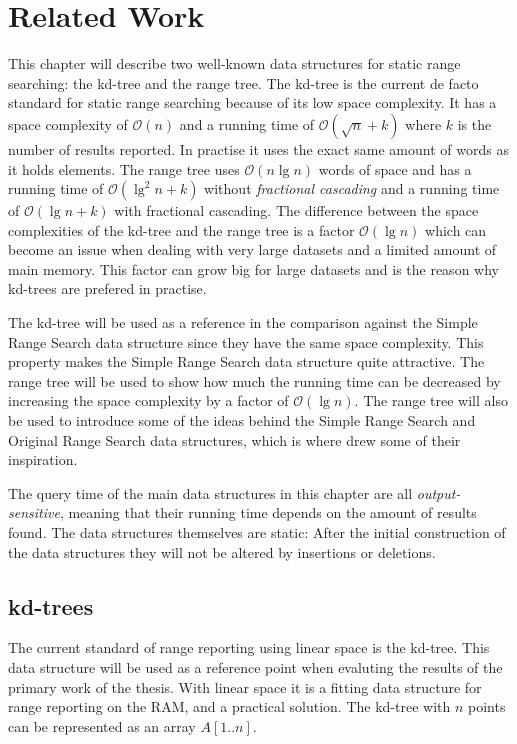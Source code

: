 \chapter{Related Work}
\label{ch:relatedwork}

This chapter will describe two well-known data structures for static range searching: the kd-tree and the range tree. The kd-tree is the current de facto standard for static range searching because of its low space complexity. It has a space complexity of $\mathcal{O}(n)$ and a running time of $\mathcal{O}(\sqrt{n} + k)$ where $k$ is the number of results reported. In practise it uses the exact same amount of words as it holds elements\cite{compgeo}. The range tree uses $\mathcal{O}(n \lg n)$ words of space and has a running time of $\mathcal{O}(\lg^2 n + k)$ without \emph{fractional cascading} and a running time of $\mathcal{O}(\lg n + k)$ with fractional cascading. The difference between the space complexities of the kd-tree and the range tree is a factor $\mathcal{O}(\lg n)$ which can become an issue when dealing with very large datasets and a limited amount of main memory. This factor can grow big for large datasets and is the reason why kd-trees are prefered in practise.

The kd-tree will be used as a reference in the comparison against the Simple Range Search data structure since they have the same space complexity. This property makes the Simple Range Search data structure quite attractive. The range tree will be used to show how much the running time can be decreased by increasing the space complexity by a factor of $\mathcal{O}(\lg n)$. The range tree will also be used to introduce some of the ideas behind the Simple Range Search and Original Range Search data structures, which is where \citet{chanetal} drew some of their inspiration.

The query time of the main data structures in this chapter are all \emph{output-sensitive}, meaning that their running time depends on the amount of results found. The data structures themselves are static: After the initial construction of the data structures they will not be altered by insertions or deletions.

\section{kd-trees}
\label{sect:kdtrees}

The current standard of range reporting using linear space is the kd-tree. This data structure will be used as a reference point when evaluting the results of the primary work of the thesis. With linear space it is a fitting data structure for range reporting on the RAM, and a practical solution. The kd-tree with $n$ points can be represented as an array $A[1..n]$.

